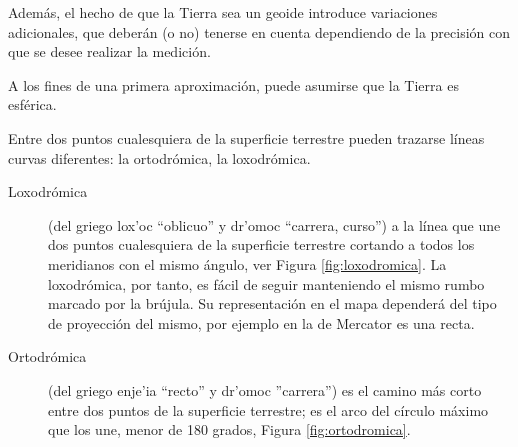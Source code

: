 \documentclass[a4paper,12pt,twoside]{article}
\begin{document}
Adem\'as, el hecho de que la Tierra sea un geoide introduce variaciones
adicionales, que deber\'an  (o no) tenerse en cuenta dependiendo de la precisi\'on con que se desee realizar la medici\'on. 

A los fines de una primera aproximaci\'on, puede asumirse que la Tierra es esf\'erica.

Entre dos puntos cualesquiera de la superficie terrestre pueden trazarse líneas curvas diferentes: la ortodrómica, la loxodrómica. %

\begin{description}
\item[Loxodr\'omica \label{loxodromica}]  (del griego   \greektext lox'oc
  \latintext ``oblicuo'' y \greektext dr'omoc
  \latintext  ``carrera, curso'') a la línea que une dos puntos cualesquiera de la
  superficie terrestre cortando a todos los meridianos con el mismo
  ángulo, ver Figura \ref{fig:loxodromica}. La loxodrómica, por tanto, es fácil de seguir manteniendo el
  mismo rumbo marcado por la brújula. Su representación en el mapa
  dependerá del tipo de proyección del mismo, por ejemplo en la de
  Mercator es una recta.

\item[Ortodrómica \label{ortodromica}] (del griego \greektext enje'ia 
\latintext ``recto'' y
\greektext dr'omoc
 \latintext ''carrera'') es el camino más corto entre dos puntos de la superficie terrestre; es el arco del círculo máximo que los une, menor de 180 grados, Figura \ref{fig:ortodromica}. 


\end{description}
\end{document}

